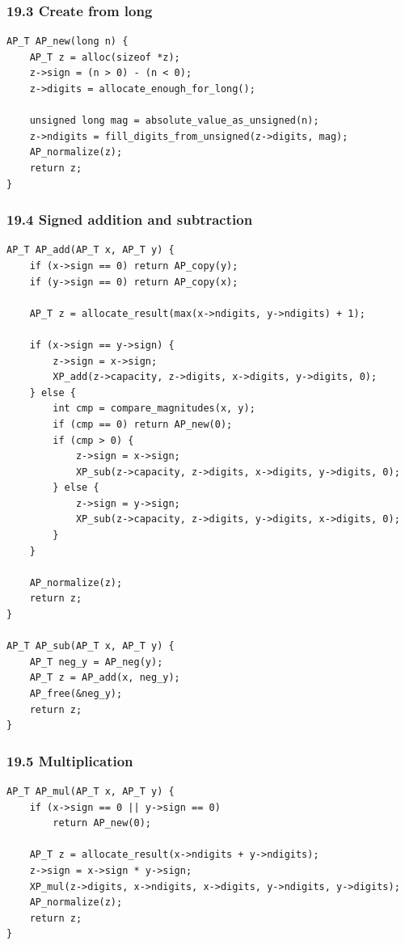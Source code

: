 \documentclass[11pt]{article}
\begin{document}
\subsubsection{19.3 Create from long}\label{create-from-long}

\begin{verbatim}
AP_T AP_new(long n) {
    AP_T z = alloc(sizeof *z);
    z->sign = (n > 0) - (n < 0);
    z->digits = allocate_enough_for_long();

    unsigned long mag = absolute_value_as_unsigned(n);
    z->ndigits = fill_digits_from_unsigned(z->digits, mag);
    AP_normalize(z);
    return z;
}
\end{verbatim}

\subsubsection{19.4 Signed addition and subtraction}\label{signed-addition-and-subtraction}

\begin{verbatim}
AP_T AP_add(AP_T x, AP_T y) {
    if (x->sign == 0) return AP_copy(y);
    if (y->sign == 0) return AP_copy(x);

    AP_T z = allocate_result(max(x->ndigits, y->ndigits) + 1);

    if (x->sign == y->sign) {
        z->sign = x->sign;
        XP_add(z->capacity, z->digits, x->digits, y->digits, 0);
    } else {
        int cmp = compare_magnitudes(x, y);
        if (cmp == 0) return AP_new(0);
        if (cmp > 0) {
            z->sign = x->sign;
            XP_sub(z->capacity, z->digits, x->digits, y->digits, 0);
        } else {
            z->sign = y->sign;
            XP_sub(z->capacity, z->digits, y->digits, x->digits, 0);
        }
    }

    AP_normalize(z);
    return z;
}

AP_T AP_sub(AP_T x, AP_T y) {
    AP_T neg_y = AP_neg(y);
    AP_T z = AP_add(x, neg_y);
    AP_free(&neg_y);
    return z;
}
\end{verbatim}

\subsubsection{19.5 Multiplication}\label{multiplication-1}

\begin{verbatim}
AP_T AP_mul(AP_T x, AP_T y) {
    if (x->sign == 0 || y->sign == 0)
        return AP_new(0);

    AP_T z = allocate_result(x->ndigits + y->ndigits);
    z->sign = x->sign * y->sign;
    XP_mul(z->digits, x->ndigits, x->digits, y->ndigits, y->digits);
    AP_normalize(z);
    return z;
}
\end{verbatim}
\end{document}

